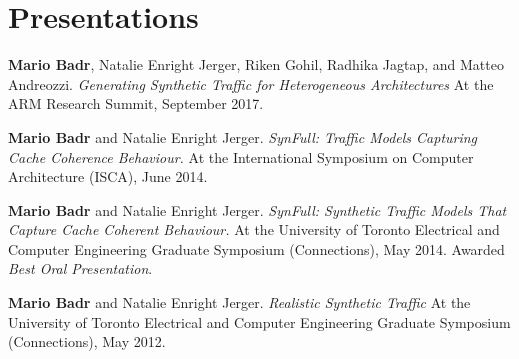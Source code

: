 \section{\sc Presentations}

\onerow
{
  \textbf{Mario Badr}, Natalie Enright Jerger, Riken Gohil, Radhika Jagtap, and Matteo Andreozzi.
  \textit{Generating Synthetic Traffic for Heterogeneous Architectures}
  At the ARM Research Summit, September 2017.
}

\onerow
{
  \textbf{Mario Badr} and Natalie Enright Jerger.
  \textit{SynFull: Traffic Models Capturing Cache Coherence Behaviour.}
  At the International Symposium on Computer Architecture (ISCA), June 2014.
}

\onerow
{
  \textbf{Mario Badr} and Natalie Enright Jerger.
  \textit{SynFull: Synthetic Traffic Models That Capture Cache Coherent Behaviour.}
  At the University of Toronto Electrical and Computer Engineering Graduate Symposium (Connections), May 2014.
  Awarded \textit{Best Oral Presentation}.
}

\onerow
{
  \textbf{Mario Badr} and Natalie Enright Jerger.
  \textit{Realistic Synthetic Traffic}
  At the University of Toronto Electrical and Computer Engineering Graduate Symposium (Connections), May 2012.
}
